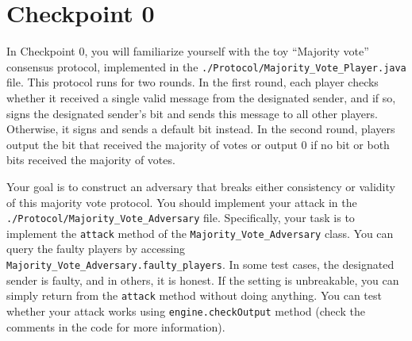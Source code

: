







\section{Checkpoint 0}
\label{sec:cp0}
In Checkpoint 0, you will familiarize yourself with the toy ``Majority vote'' consensus protocol, %
implemented in the {\tt ./Protocol/Majority\_Vote\_Player.java} file.
This protocol runs for two rounds. In the first round, each player checks whether it received a single valid message from the designated sender, and if so, signs the
designated sender's bit and sends this message to all other players.
Otherwise,
it signs and sends a default bit instead. In the second round, players output the bit that received the majority of votes or output 0 if no bit or both bits received the majority of votes.

Your goal is to construct an adversary that breaks either consistency or validity of this majority vote protocol.
You should implement your attack in the {\tt ./Protocol/Majority\_Vote\_Adversary} file.
Specifically, your task is to implement the \texttt{attack} method of the \texttt{Majority\_Vote\_Adversary} class.
You can query the faulty players by accessing
    {\tt Majority\_Vote\_Adversary.faulty\_players}.
In some test cases, the
designated sender is faulty, and in others, it is honest. If the setting is unbreakable, you can simply return from the \texttt{attack} method without doing anything.
You can test whether your attack works using \texttt{engine.checkOutput} method (check the comments in the code for more information). 

